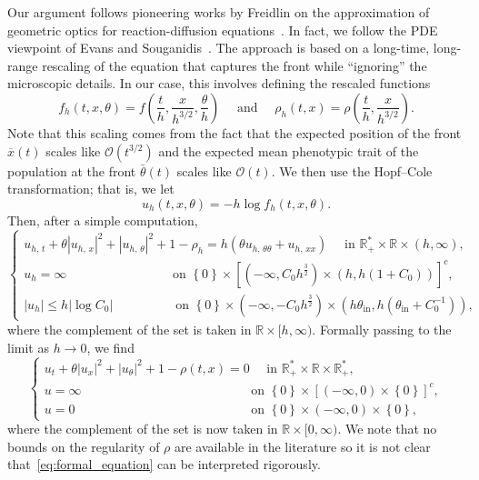 \documentclass[10pt]{amsart}
\theoremstyle{definition}\newtheorem{defi}[theo]{Definition}\newtheorem{rema}[theo]{Remark}\newtheorem{exam}[theo]{Example}\newtheorem{exem}[theo]{Example}\newtheorem{nota}[theo]{Notation}
\newcommand{\rmin}{\mathrm{in}}
\newcommand{\R}{\mathbb{R}}
\newcommand{\mO}{\mathcal{O}}
\newcommand{\1}{\mathds{1}}
\begin{document}
Our argument follows pioneering works by Freidlin on the approximation of geometric optics for reaction-diffusion equations~\cite{Freidlin2,freidlin_geometric_1986}. In fact, we follow the PDE viewpoint of Evans and Souganidis~\cite{EvansSouganidis}. The approach is based on a long-time, long-range rescaling of the equation that captures the front while ``ignoring'' the microscopic details. In our case, this involves defining the rescaled functions
\[
f_h(t,x,\theta) = f\left(\frac{t}{h},\frac{x}{h^{3/2}},\frac{\theta}{h}\right) \quad \text{ and } \quad
\rho_h(t,x) = \rho\left(\frac{t}{h},\frac{x}{h^{3/2}}\right).
\]
Note that this scaling comes from the fact that the expected position of the front $\overline x(t)$ scales like $\mO(t^{3/2})$ and the expected mean phenotypic trait of the population at the front $\bar \theta(t)$ scales like $\mO(t)$. We then use the Hopf--Cole transformation; that is, we let
\begin{equation}\label{eq:u_h}
u_h(t,x,\theta) = - h\log f_h(t,x,\theta).
\end{equation}
Then, after a simple computation,
\begin{equation*}
\begin{cases}
u_{h,\,t} +\theta | u_{h,\,x}|^2+|u_{h,\,\theta}|^2+1-\rho_h=h \left(\theta u_{h,\,\theta\theta} + u_{h,\,xx}\right) \quad \text{ in } \R_+^* \times \R \times (h,\infty),\\[0.10em]
u_h=\infty \hspace{96pt} \text{ on } \left\{0\right\} \times \left[\left(-\infty, C_0 h^\frac32\right) \times \left(h, h (1 + C_0)\right)\right]^c,\\[0.14em]
|u_h|\leq h |\log C_0| \hspace{55pt} \text{ on } \left\{0\right\}\times \left(-\infty,-C_0h^\frac32\right)\times \left(h \theta_{\rmin}, h\left(\theta_{\rmin}+C_0^{-1}\right)\right),
\end{cases}
\end{equation*}
where the complement of the set is taken in $\R\times[h,\infty)$. Formally passing to the limit as $h\to 0$, we find
\begin{equation}\label{eq:formal_equation}
\begin{cases}
u_t+ \theta| u_{x}|^2+|u_{\theta}|^2+1-\rho(t,x) =0 \quad\text{ in } \R_+^* \times \R \times \R_+^*,\\
u=\infty \hspace{156pt} \text{ on } \left\{0\right\}\times [(-\infty,0)\times\left\{0\right\}]^c,\\%
u= 0 \hspace{162pt} \text{ on } \left\{0\right\} \times (-\infty,0)\times \left\{0\right\},
\end{cases}
\end{equation}
where the complement of the set is now taken in $\R\times[0,\infty)$. We note that no bounds on the regularity of $\rho$ are available in the literature so it is not clear that~\eqref{eq:formal_equation} can be interpreted rigorously.
\end{document}
